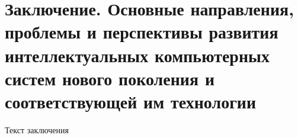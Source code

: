 

\chapter*{\LARGE Заключение. Основные направления, проблемы и перспективы развития интеллектуальных компьютерных систем нового поколения и соответствующей им технологии}
\label{chap_conclusion}

Текст заключения
